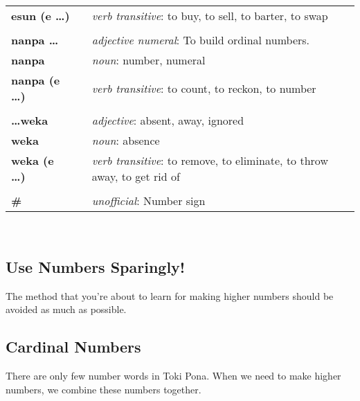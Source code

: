 \begin{supertabular}{p{2,5cm}|ll}
\textbf{esun (e \dots)} && \textit{verb transitive}: to buy, to sell, to barter, to swap \\ %
 && \\ %
%
\textbf{nanpa \dots} && \textit{adjective numeral}: To build ordinal numbers. \\ %
\textbf{nanpa} && \textit{noun}: number, numeral \\ %
\textbf{nanpa (e \dots)} && \textit{verb transitive}: to count, to reckon,  to number \\ %
 && \\ %
%
\textbf{\dots weka} && \textit{adjective}: absent, away, ignored \\ %
\textbf{weka} && \textit{noun}: absence \\ %
\textbf{weka (e \dots)} && \textit{verb transitive}: to remove, to eliminate, to throw away, to get rid of \\ %
 && \\ %
%
\index{\#}
\textbf{\#} && \textit{unofficial}: Number sign  \\ %
%
\end{supertabular} \\
%
%
%
\newpage
%
\subsection*{Use Numbers Sparingly!}
%
%
The method that you're about to learn for making higher numbers should be avoided as much as possible. 
%

\subsection*{Cardinal Numbers}
%
There are only few number words in Toki Pona.
When we need to make higher numbers, we combine these numbers together. 

